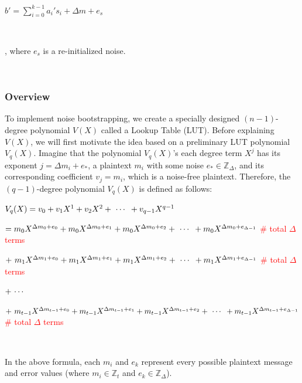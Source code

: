 $ $

$b' = \sum\limits_{i=0}^{k-1} a_i's_i + \Delta m + e_s$

$ $

, where $e_s$ is a re-initialized noise. 

$ $
\subsubsection{Overview}
\label{subsec:bootstrapping-overview}

To implement noise bootstrapping, we create a specially designed $(n-1)$-degree polynomial $V(X)$ called a Lookup Table (LUT). Before explaining $V(X)$, we will first motivate the idea based on a preliminary LUT polynomial $V_q(X)$. Imagine that the polynomial $V_q(X)$'s each degree term $X^{j}$ has its exponent $j = \Delta m_i + e_*$, a plaintext $m_i$ with some noise $e_* \in \mathbb{Z}_{\Delta}$, and its corresponding coefficient $v_{j} = m_i$, which is a noise-free plaintext. Therefore, the $(q-1)$-degree polynomial $V_q(X)$ is defined as follows:

$V_q(X) = v_0 + v_1X^1 + v_2X^2 + \text{ } \text{$\cdots$} \text{ } + v_{q-1}X^{q-1}$

\text{ } $= m_0X^{\Delta m_0 + e_0} + m_0X^{\Delta m_0 + e_1} + m_0X^{\Delta m_0 + e_2} + \text{ } \text{$\cdots$} \text{ } + m_0X^{\Delta m_0 + e_{\Delta - 1}}$ \textcolor{red}{ \# total $\Delta$ terms}

\text{ } $ + \text{ } m_1X^{\Delta m_1 + e_0} + m_1X^{\Delta m_1 + e_1} + m_1X^{\Delta m_1 + e_2} + \text{ } \text{$\cdots$} \text{ } + m_1X^{\Delta m_1 + e_{\Delta - 1}}$ \textcolor{red}{ \# total $\Delta$ terms}

\text{ } $ + \text{ } \text{$\cdots$} \text{ } $

\text{ } $ + \text{ } m_{t - 1}X^{\Delta m_{t - 1} + e_0} + m_{t - 1}X^{\Delta m_{t - 1} + e_1} + m_{t - 1}X^{\Delta m_{t - 1} + e_2} + \text{ } \text{$\cdots$} \text{ } + m_{t - 1}X^{\Delta m_{t - 1} + e_{\Delta - 1}}$ \textcolor{red}{ \# total $\Delta$ terms}

$ $

In the above formula, each $m_i$ and $e_k$ represent every possible plaintext message and error values (where $m_i \in \mathbb{Z}_t$ and $e_k \in \mathbb{Z}_{\Delta}$). %

